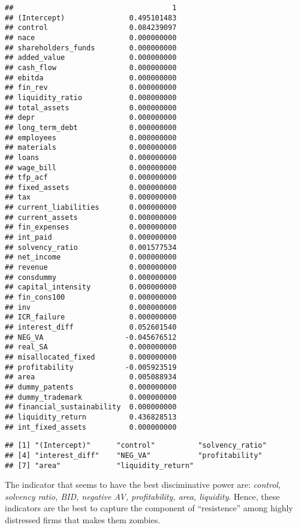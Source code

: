 \documentclass[]{article}
\newenvironment{Shaded}{\begin{snugshade}}{\end{snugshade}}
\newcommand{\DecValTok}[1]{\textcolor[rgb]{0.00,0.00,0.81}{#1}}
\newcommand{\FloatTok}[1]{\textcolor[rgb]{0.00,0.00,0.81}{#1}}
\newcommand{\KeywordTok}[1]{\textcolor[rgb]{0.13,0.29,0.53}{\textbf{#1}}}
\newcommand{\NormalTok}[1]{#1}
\newcommand{\OperatorTok}[1]{\textcolor[rgb]{0.81,0.36,0.00}{\textbf{#1}}}
\begin{document}
\begin{verbatim}
##                                     1
## (Intercept)               0.495101483
## control                   0.084239097
## nace                      0.000000000
## shareholders_funds        0.000000000
## added_value               0.000000000
## cash_flow                 0.000000000
## ebitda                    0.000000000
## fin_rev                   0.000000000
## liquidity_ratio           0.000000000
## total_assets              0.000000000
## depr                      0.000000000
## long_term_debt            0.000000000
## employees                 0.000000000
## materials                 0.000000000
## loans                     0.000000000
## wage_bill                 0.000000000
## tfp_acf                   0.000000000
## fixed_assets              0.000000000
## tax                       0.000000000
## current_liabilities       0.000000000
## current_assets            0.000000000
## fin_expenses              0.000000000
## int_paid                  0.000000000
## solvency_ratio            0.001577534
## net_income                0.000000000
## revenue                   0.000000000
## consdummy                 0.000000000
## capital_intensity         0.000000000
## fin_cons100               0.000000000
## inv                       0.000000000
## ICR_failure               0.000000000
## interest_diff             0.052601540
## NEG_VA                   -0.045676512
## real_SA                   0.000000000
## misallocated_fixed        0.000000000
## profitability            -0.005923519
## area                      0.005088934
## dummy_patents             0.000000000
## dummy_trademark           0.000000000
## financial_sustainability  0.000000000
## liquidity_return          0.436828513
## int_fixed_assets          0.000000000
\end{verbatim}

\begin{Shaded}
\end{Shaded}

\begin{verbatim}
## [1] "(Intercept)"      "control"          "solvency_ratio"  
## [4] "interest_diff"    "NEG_VA"           "profitability"   
## [7] "area"             "liquidity_return"
\end{verbatim}

The indicator that seems to have the best disciminative power are:
\textit{control, solvency ratio, BID, negative AV, profitability, area, liquidity}.
Hence, these indicators are the best to capture the component of
``resistence'' among highly distressed firms that makes them zombies.
\end{document}
